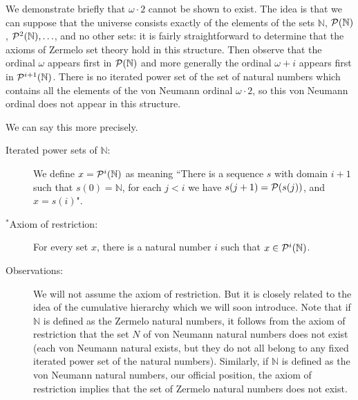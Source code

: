 \documentclass[12pt]{book}
\begin{document}
We demonstrate briefly that $\omega \cdot 2$ cannot be shown to exist.  The idea is that we can suppose that the universe consists exactly of the elements of the sets $\mathbb N$, ${\cal P}(\mathbb N)$, ${\cal P}^2(\mathbb N),\ldots$, and no other sets:  it is fairly straightforward to determine that the axioms of Zermelo set theory hold in this structure.  Then observe that  the ordinal $\omega$ appears first in ${\cal P}(\mathbb N)$ and more generally the ordinal $\omega+i$ appears first in ${\cal P}^{i+1}(\mathbb N)$.  There is no iterated power set of the set of natural numbers which contains all the elements of the von Neumann ordinal $\omega \cdot 2$, so this von Neumann ordinal does not appear in this structure.

We can say this more precisely.

\begin{description}

\item[Iterated power sets of $\mathbb N$:]  We define $x = {\cal P}^i(\mathbb N)$ as meaning ``There is a sequence $s$ with domain $i+1$
such that $s(0)={\mathbb N}$, for each $j < i$ we have $s(j+1) = {\cal P}(s(j))$, and $x = s(i)$".

\item[$^*$Axiom of restriction:]  For every set $x$, there is a natural number $i$ such that $x \in {\cal P}^i({\mathbb N})$.

\item[Observations:]  We will not assume the axiom of restriction.  But it is closely related to the idea of the cumulative hierarchy which we will soon introduce.  Note that if $\mathbb N$ is defined as the Zermelo natural numbers, it follows from the axiom of restriction that the set $N$ of von Neumann natural numbers does not exist (each von Neumann natural exists, but they do not all belong to any fixed iterated power set of the natural numbers).  Similarly, if $\mathbb N$ is defined as the von Neumann natural numbers, our official position, the axiom of restriction implies that the set of Zermelo natural numbers does not exist.


\end{description}
\end{document}
